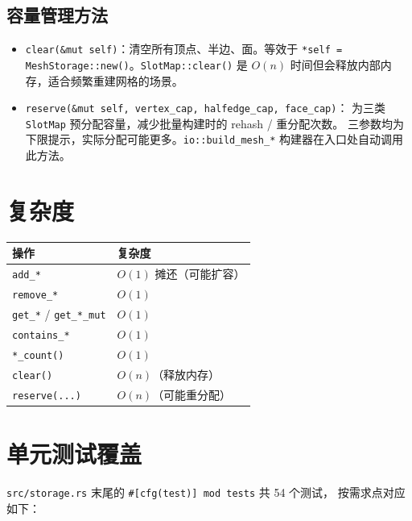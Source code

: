 \documentclass[11pt,a4paper]{article}
\begin{document}
\subsection{容量管理方法}

\begin{itemize}
  \item \texttt{clear(\&mut self)}：清空所有顶点、半边、面。等效于
        \texttt{*self = MeshStorage::new()}。\texttt{SlotMap::clear()} 是 $O(n)$
        时间但会释放内部内存，适合频繁重建网格的场景。
  \item \texttt{reserve(\&mut self, vertex\_cap, halfedge\_cap, face\_cap)}：
        为三类 \texttt{SlotMap} 预分配容量，减少批量构建时的 rehash / 重分配次数。
        三参数均为下限提示，实际分配可能更多。\texttt{io::build\_mesh\_*}
        构建器在入口处自动调用此方法。
\end{itemize}

\section{复杂度}

\begin{center}
\renewcommand{\arraystretch}{1.18}
\begin{tabular}{@{}ll@{}}
  \toprule
  \textbf{操作} & \textbf{复杂度} \\
  \midrule
  \texttt{add\_*}        & $O(1)$ 摊还（可能扩容） \\
  \texttt{remove\_*}     & $O(1)$ \\
  \texttt{get\_*} / \texttt{get\_*\_mut} & $O(1)$ \\
  \texttt{contains\_*}   & $O(1)$ \\
  \texttt{*\_count()}    & $O(1)$ \\
  \texttt{clear()}       & $O(n)$（释放内存） \\
  \texttt{reserve(...)}  & $O(n)$（可能重分配） \\
  \bottomrule
\end{tabular}
\end{center}

\section{单元测试覆盖}

\texttt{src/storage.rs} 末尾的 \texttt{\#[cfg(test)] mod tests} 共 54 个测试，
按需求点对应如下：
\end{document}
